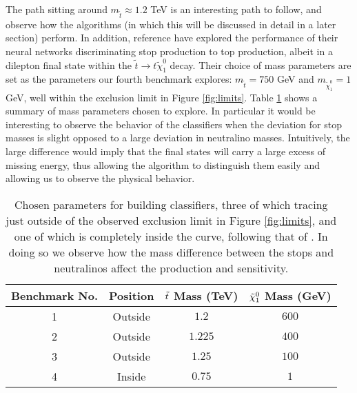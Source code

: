The path sitting around $ m_{\tilde{t}} \approx 1.2$ TeV is an interesting path to follow, and observe how the algorithms (in which this will be discussed in detail in a later section) perform. In addition, reference \cite{roxlo2018opening} have explored the performance of their neural networks discriminating stop production to top production, albeit in a dilepton final state within the $\tilde{t} \rightarrow t \tilde{\chi}_1^0$ decay. Their choice of mass parameters are set as the parameters our fourth benchmark explores: $m_{\tilde{t}} =750$ GeV and $m_{\tilde{\chi}_1^0} = 1$ GeV, well within the exclusion limit in Figure \ref{fig:limits}. Table \ref{tab:benchmarks} shows a summary of mass parameters chosen to explore. In particular it would be interesting to observe the behavior of the classifiers when the deviation for stop masses is slight opposed to a large deviation in neutralino masses. Intuitively, the large difference would imply that the final states will carry a large excess of missing energy, thus allowing the algorithm to distinguish them easily and allowing us to observe the physical behavior. 

\begin{table}[htbp]
    \centering
    \begin{tabular}{c|c|c|c} 
    \toprule
    Benchmark No. & Position & $\Tilde{t}$ Mass (TeV) & $\Tilde{\chi}_1^0$ Mass (GeV) \\
    \midrule
    \rowcolor{gray!6} 1 & Outside & $ 1.2 $ & $ 600 $ \\
    2 & Outside & $ 1.225 $ & $ 400 $ \\
    \rowcolor{gray!6} 3 & Outside & $ 1.25 $ & $ 100 $ \\
    4 & Inside & $ 0.75 $ & $ 1 $\\
    \bottomrule
    \end{tabular}
    \caption{Chosen parameters for building classifiers, three of which tracing just outside of the observed exclusion limit in Figure \ref{fig:limits}, and one of which is completely inside the curve, following that of \cite{roxlo2018opening}. In doing so we observe how the mass difference between the stops and neutralinos affect the production and sensitivity.} 
    \label{tab:benchmarks}
\end{table}

